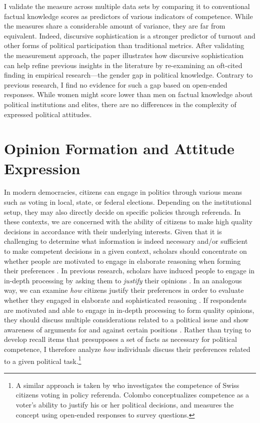I validate the measure across multiple data sets by comparing it to conventional factual knowledge scores as predictors of various indicators of competence. While the measures share a considerable amount of variance, they are far from equivalent. Indeed, discursive sophistication is a stronger predictor of turnout and other forms of political participation than traditional metrics. After validating the measurement approach, the paper illustrates how discursive sophistication can help refine previous insights in the literature by re-examining an oft-cited finding in empirical research---the gender gap in political knowledge. Contrary to previous research, I find no evidence for such a gap based on open-ended responses. While women might score lower than men on factual knowledge about political institutions and elites, there are no differences in the complexity of expressed political attitudes.



\section{Opinion Formation and Attitude Expression}

In modern democracies, citizens can engage in politics through various means such as voting in local, state, or federal elections. Depending on the institutional setup, they may also directly decide on specific policies through referenda. In these contexts, we are concerned with the ability of citizens to make high quality decisions in accordance with their underlying interests. Given that it is challenging to determine what information is indeed necessary and/or sufficient to make competent decisions in a given context, scholars should concentrate on whether people are motivated to engage in elaborate reasoning when forming their preferences \citep{druckman2014pathologies}. In previous research, scholars have induced people to engage in in-depth processing by asking them to \textit{justify} their opinions \citep[e.g., by providing specific reasons;][]{kunda1999motivated,redlawsk2002hot,bolsen2014influence,druckman2014pathologies}. In an analogous way, we can examine \textit{how} citizens justify their preferences in order to evaluate whether they engaged in elaborate and sophisticated reasoning \citep[see also][]{rosenberg1988structure,rosenberg1988political}. If respondents are motivated and able to engage in in-depth processing to form quality opinions, they should discuss multiple considerations related to a political issue and show awareness of arguments for and against certain positions \citep{cappella2002argument}. Rather than trying to develop recall items that presupposes a set of facts as necessary for political competence, I therefore analyze \textit{how} individuals discuss their preferences related to a given political task.\footnote{A similar approach is taken by \citet{colombo2016justifications} who investigates the competence of Swiss citizens voting in policy referenda. Colombo conceptualizes competence as a voter’s ability to justify his or her political decisions, and measures the concept using open-ended responses to survey questions.}

